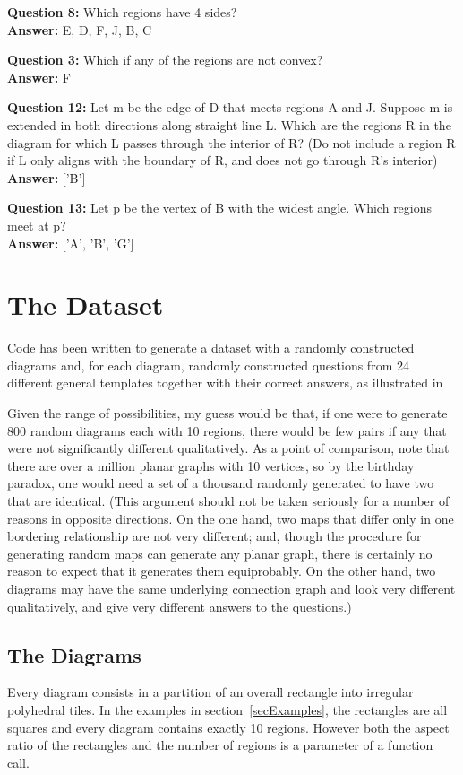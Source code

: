 \documentclass{article}    %
\begin{document}
{\bf Question  8:}  Which regions have 4 sides? \\
{\bf Answer:}  {E, D, F, J, B, C}

{\bf Question  3:} Which if any of the regions are not convex? \\
{\bf Answer:}  {F}

{\bf Question  12:} Let m be the edge of D that meets regions A and J. Suppose m is extended in both directions along straight line L. Which are the regions R in the diagram for which L passes through the interior of R? (Do not include a region R if L only aligns with the boundary of R, and does not go through R's interior) \\
{\bf Answer:}  ['B']

{\bf Question  13:} Let p be the vertex of B with the widest angle. Which regions meet at p? \\
{\bf Answer:}  ['A', 'B', 'G']



\section{The Dataset}
\label{secBenchmark}
Code has been written to generate a dataset with a randomly constructed diagrams
and, for each diagram, randomly constructed questions from 24 different 
general templates together with their correct answers, as illustrated in

Given the range of possibilities, my guess would be that, if one were to
generate 800 random diagrams each with 10 regions, there would be few pairs 
if any that were not significantly different qualitatively. As a point of 
comparison, note that there are over a million planar graphs with 10 vertices,
so by the birthday paradox, one would need a set of a thousand randomly 
generated to have two that are identical. (This argument should not be taken
seriously for a number of reasons in opposite directions. On the one hand,
two maps that differ only in one bordering relationship are not very different;
and, though the procedure for generating random maps can generate any planar 
graph, there is certainly no reason to expect that it generates them 
equiprobably. On the other hand, two diagrams may have the same underlying 
connection graph and look very different qualitatively, and give very different
answers to the questions.)

\subsection{The Diagrams}
\label{secDiagrams}
Every diagram consists in a partition of an overall rectangle into irregular
polyhedral tiles. In the examples in section~\ref{secExamples}, the rectangles
are all squares and every diagram contains exactly 10 regions. However both the
aspect ratio of the rectangles and the number of regions is a parameter of a 
function call. 
\end{document}
